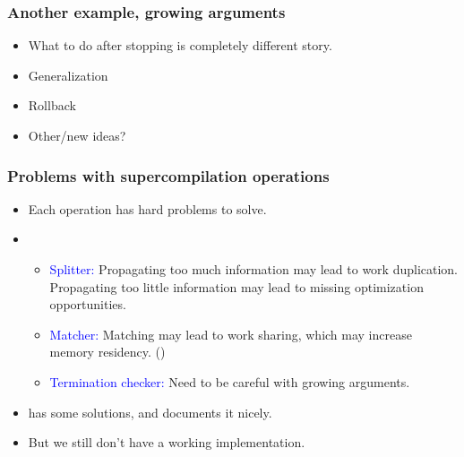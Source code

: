 \documentclass{beamer}
\begin{document}
\begin{frame}
    \frametitle{Another example, growing arguments}

    \begin{itemize}
        \item[]
            What to do after stopping is completely different story.

        \item[]
            Generalization

        \item[]
            Rollback

        \item[]
            Other/new ideas?
    \end{itemize}
\end{frame}

\begin{frame}
    \frametitle{Problems with supercompilation operations}

    \begin{itemize}[<+->]
        \item[]
            Each operation has hard problems to solve.

        \item[]
            \begin{itemize}[<+->]
                \item[]
                    \textcolor{blue}{Splitter:} Propagating too much information
                    may lead to work duplication. Propagating too little
                    information may lead to missing optimization opportunities.

                \item[]
                    \textcolor{blue}{Matcher:} Matching may lead to work
                    sharing, which may increase memory residency.
                    (\citet{commonsubexpression})

                \item[]
                    \textcolor{blue}{Termination checker:} Need to be careful
                    with growing arguments.
            \end{itemize}

        \item[]
            \citet{callbyneed-sc} has some solutions, and documents it
            nicely.

        \item[]
            But we still don't have a working implementation.
    \end{itemize}
\end{frame}
\end{document}
